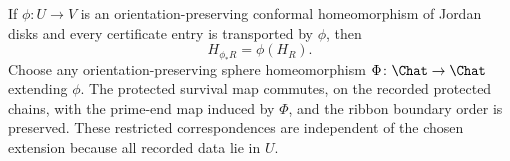 \begin{proposition}
\label{prop:naturality}
If $\phi\colon U\to V$ is an orientation-preserving conformal
homeomorphism of Jordan disks and every certificate entry is transported
by $\phi$, then
\begin{equation}\label{eq:C-naturality}
H_{\phi_*R}=\phi(H_R).
\end{equation}
Choose any orientation-preserving sphere homeomorphism
$\Phi\colon\Chat\to\Chat$ extending $\phi$.  The protected survival map
commutes, on the recorded protected chains, with the prime-end map induced
by $\Phi$, and the ribbon boundary order is preserved.  These restricted
correspondences are independent of the chosen extension because all
recorded data lie in $U$.
\end{proposition}

